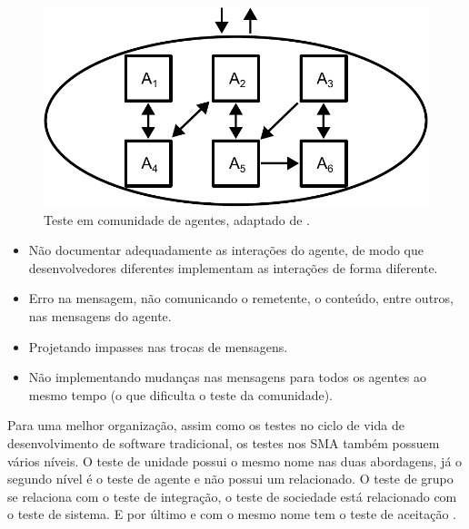 \begin{figure}[ht]
\centering
\includegraphics[scale=0.7]{imagens/community_agents.pdf}
\caption{Teste em comunidade de agentes, adaptado de \cite{rouff2002test}.}
\label{comunity}
\end{figure}

\begin{itemize}
\item Não documentar adequadamente as interações do agente, de modo que desenvolvedores diferentes implementam as interações de forma diferente.
\item Erro na mensagem, não comunicando o remetente, o conteúdo, entre outros, nas mensagens do agente.
\item Projetando impasses nas trocas de mensagens.
\item Não implementando mudanças nas mensagens para todos os agentes ao mesmo tempo (o que dificulta o teste da comunidade).
\end{itemize}

Para uma melhor organização, assim como os testes no ciclo de vida de desenvolvimento de software tradicional, os testes nos SMA também possuem vários níveis. O teste de unidade possui o mesmo nome nas duas abordagens, já o segundo nível é o teste de agente e não possui um relacionado. O teste de  grupo se relaciona com o teste de integração, o teste de sociedade está relacionado com o teste de sistema. E por último e com o mesmo nome tem o teste de aceitação \cite{houhamdi2011multi}. 

